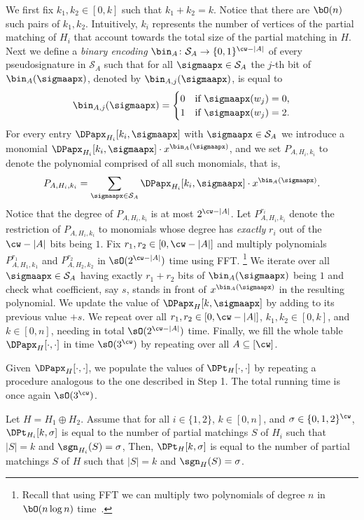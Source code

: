 We first fix $k_1,k_2 \in [0,k]$ such that $k_1+k_2=k$.
Notice that there are $\bO(n)$ such pairs of $k_1,k_2$.
Intuitively, $k_i$ represents the number of vertices of the partial matching of $H_i$ that account towards the
total size of the partial matching in $H$.
Next we define a \emph{binary encoding} $\bin_A \colon \mathcal{S}_A \to \{0,1\}^{\cw-|A|}$
of every pseudosignature in $\mathcal{S}_A$ such that for all $\sigmaapx \in \mathcal{S}_A$
the $j$-th bit of $\bin_A(\sigmaapx)$, denoted by $\bin_{A,j}(\sigmaapx)$,
is equal to
\[
    \bin_{A,j}(\sigmaapx) =
        \begin{cases}
            0   &\text{if $\sigmaapx(w_j) = 0$,}\\
            1   &\text{if $\sigmaapx(w_j) = 2$.}
        \end{cases}
\]
For every entry $\DPapx_{H_i}[k_i,\sigmaapx]$ with $\sigmaapx \in \mathcal{S}_A$ we introduce a monomial
$\DPapx_{H_i}[k_i,\sigmaapx] \cdot x^{\bin_A(\sigmaapx)}$,
and we set $P_{A,H_i,k_i}$ to denote the polynomial comprised of all such monomials,
that is,
\[
    P_{A,H_i,k_i} = \sum_{\sigmaapx \in \mathcal{S}_A} \DPapx_{H_i}[k_i,\sigmaapx] \cdot x^{\bin_A(\sigmaapx)}.
\]
Notice that the degree of $P_{A,H_i,k_i}$ is at most $2^{\cw-|A|}$.
Let $P_{A,H_i,k_i}^{r_i}$ denote the restriction of $P_{A,H_i,k_i}$ to monomials whose degree has
\emph{exactly} $r_i$ out of the $\cw-|A|$ bits being $1$.
Fix $r_1,r_2 \in [0,\cw-|A|]$ and multiply polynomials $P_{A,H_1,k_1}^{r_1}$ and $P_{A,H_2,k_2}^{r_2}$ in
$\sO(2^{\cw - |A|})$ time using FFT.%
\footnote{Recall that using FFT we can multiply two polynomials of degree $n$ in
$\bO(n \log n)$ time~\cite{issac/Moenck76}.}
We iterate over all $\sigmaapx \in \mathcal{S}_A$ having exactly $r_1+r_2$ bits of
$\bin_A(\sigmaapx)$ being $1$ and check what coefficient, say $s$, stands in front
of $x^{\bin_A(\sigmaapx)}$ in the resulting polynomial.
We update the value of $\DPapx_H[k,\sigmaapx]$ by adding to its previous value $+s$.
We repeat over all $r_1,r_2 \in [0,\cw-|A|]$, $k_1,k_2 \in [0,k]$, and $k \in [0,n]$,
needing in total $\sO(2^{\cw-|A|})$ time.
Finally, we fill the whole table $\DPapx_H[\cdot,\cdot]$ in time $\sO(3^{\cw})$ by repeating
over all $A \subseteq [\cw]$.


Given $\DPapx_H[\cdot,\cdot]$, we populate the values of $\DPt_H[\cdot,\cdot]$
by repeating a procedure analogous to the one described in Step 1.
The total running time is once again $\sO(3^{\cw})$.


\begin{lemmarep}[\appsymb]\label{lemma:induced:cw:union-correctness}
    Let $H = H_1 \oplus H_2$.
    Assume that for all $i \in \{1,2\}$, $k \in [0,n]$, and $\sigma \in \{0,1,2\}^{\cw}$,
    $\DPt_{H_i}[k,\sigma]$ is equal to the number of partial matchings $S$ of $H_i$ such that $|S|=k$ and $\sgn_{H_i}(S)=\sigma$,
    Then, $\DPt_H[k,\sigma]$ is equal to the number of partial matchings $S$ of $H$ such that $|S|=k$ and $\sgn_H(S) = \sigma$.
\end{lemmarep}

